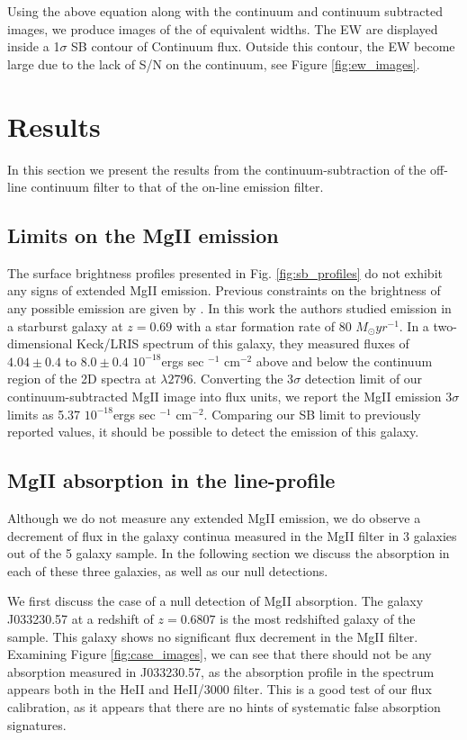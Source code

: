 \documentclass[twocolumn]{aastex6}
\begin{document}
Using the above equation along with the continuum and continuum subtracted images, we produce images of the of equivalent widths. The EW are displayed inside a 1$\sigma$ SB contour of Continuum flux. Outside this contour, the EW become large due to the lack of S/N on the continuum, see Figure \ref{fig:ew_images}. 

\section{Results}
In this section we present the results from the continuum-subtraction of the off-line continuum filter to that of the on-line emission filter. 

\subsection{Limits on the MgII emission}
The surface brightness profiles presented in Fig. \ref{fig:sb_profiles} do not exhibit any signs of extended MgII emission. Previous constraints on the brightness of any possible emission are given by  \citep{Rubin_2011}. In this work the authors studied emission in a starburst galaxy at $z=0.69$ with a star formation rate of 80 $M_{\odot} yr^{-1}$. In a two-dimensional Keck/LRIS spectrum of this galaxy, they measured fluxes of $4.04 \pm 0.4$ to $8.0\pm 0.4$ $10^{-18}$ergs sec $^{-1}$ cm$^{-2}$  above and below the continuum region of the 2D spectra at $\lambda 2796$. Converting the 3$\sigma$ detection limit of our continuum-subtracted MgII image into flux units, we report the MgII emission 3$\sigma$ limits as 5.37 $10^{-18}$ergs sec $^{-1}$ cm$^{-2}$. Comparing our SB limit to previously reported values, it should be possible to detect the emission of this galaxy.

\subsection{MgII absorption in the line-profile}
Although we do not measure any extended MgII emission, we do observe a decrement of flux in the galaxy continua measured in the MgII filter in 3 galaxies out of the 5 galaxy sample. In the following section we discuss the absorption in each of these three galaxies, as well as our null detections.

We first discuss the case of a null detection of MgII absorption. The galaxy J033230.57 at a redshift of $z=0.6807$ is the most redshifted galaxy of the sample. This galaxy shows no significant flux decrement in the MgII filter. Examining Figure \ref{fig:case_images}, we can see that there should not be any absorption measured in J033230.57, as the absorption profile in the spectrum appears both in the HeII and HeII/3000 filter. This is a good test of our flux calibration, as it appears that there are no hints of systematic false absorption signatures.
\end{document}
